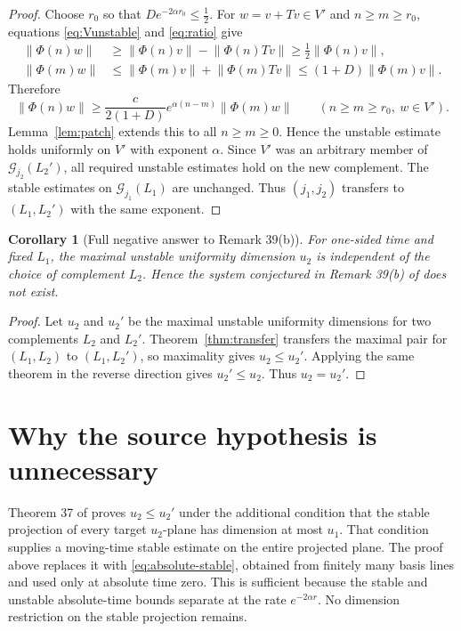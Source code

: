 \documentclass[11pt]{article}
\newtheorem{corollary}{Corollary}
\theoremstyle{definition}
\newcommand{\G}{\mathcal G}
\newcommand{\Phiop}{\Phi}
\newcommand{\norm}[1]{\left\lVert #1\right\rVert}
\begin{document}
\begin{proof}
Choose $r_0$ so that $D e^{-2\alpha r_0}\le\tfrac12$.  For
$w=v+Tv\in V'$ and $n\ge m\ge r_0$, equations \eqref{eq:Vunstable} and
\eqref{eq:ratio} give
\begin{align*}
 \norm{\Phiop(n)w}
 &\ge \norm{\Phiop(n)v}-\norm{\Phiop(n)Tv}
 \ge \tfrac12\norm{\Phiop(n)v},\\
 \norm{\Phiop(m)w}
 &\le \norm{\Phiop(m)v}+\norm{\Phiop(m)Tv}
 \le (1+D)\norm{\Phiop(m)v}.
\end{align*}
Therefore
\[
 \norm{\Phiop(n)w}
 \ge \frac{c}{2(1+D)}e^{\alpha(n-m)}\norm{\Phiop(m)w}
 \qquad(n\ge m\ge r_0,\ w\in V').
\]
Lemma~\ref{lem:patch} extends this to all $n\ge m\ge0$.  Hence the unstable
estimate holds uniformly on $V'$ with exponent $\alpha$.  Since $V'$ was an
arbitrary member of $\G_{j_2}(L_2')$, all required unstable estimates hold on
the new complement.  The stable estimates on $\G_{j_1}(L_1)$ are unchanged.
Thus $(j_1,j_2)$ transfers to $(L_1,L_2')$ with the same exponent.
\end{proof}

\begin{corollary}[Full negative answer to Remark 39(b)]
For one-sided time and fixed $L_1$, the maximal unstable uniformity dimension
$u_2$ is independent of the choice of complement $L_2$.  Hence the system
conjectured in Remark 39(b) of \cite{CKS} does not exist.
\end{corollary}

\begin{proof}
Let $u_2$ and $u_2'$ be the maximal unstable uniformity dimensions for two
complements $L_2$ and $L_2'$.  Theorem~\ref{thm:transfer} transfers the maximal
pair for $(L_1,L_2)$ to $(L_1,L_2')$, so maximality gives $u_2\le u_2'$.
Applying the same theorem in the reverse direction gives $u_2'\le u_2$.
Thus $u_2=u_2'$.
\end{proof}

\section{Why the source hypothesis is unnecessary}

Theorem 37 of \cite{CKS} proves $u_2\le u_2'$ under the additional condition
that the stable projection of every target $u_2$-plane has dimension at most
$u_1$.  That condition supplies a moving-time stable estimate on the entire
projected plane.  The proof above replaces it with
\eqref{eq:absolute-stable}, obtained from finitely many basis lines and used
only at absolute time zero.  This is sufficient because the stable and
unstable absolute-time bounds separate at the rate $e^{-2\alpha r}$.  No
dimension restriction on the stable projection remains.
\end{document}
